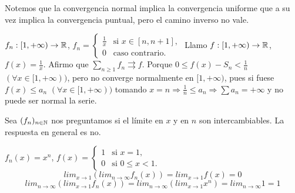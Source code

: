 Notemos que la convergencia normal implica la convergencia uniforme que a su vez implica la convergencia puntual, pero el camino inverso no vale.

\begin{eg}
  $f_n: [1, +\infty) \to \mathbb{R}$, $f_n = \begin{cases}
    \frac{1}{x} & \text{si } x \in [n, n+1], \\
    0 & \text{caso contrario.}
  \end{cases}$
  Llamo $f: [1, +\infty) \to \mathbb{R}$, $f(x) = \frac{1}{x}$. Afirmo que $\sum_{n \geq 1} f_n \rightrightarrows f$. Porque $0 \leq f(x) - S_n < \frac{1}{n}$ $(\forall x \in [1, +\infty))$, pero no converge normalmente en $[1, +\infty)$, pues si fuese $f(x) \leq a_n$ $(\forall x \in [1, +\infty))$ tomando $x = n \Rightarrow \frac{1}{n} \leq a_n \Rightarrow \sum a_n = +\infty$ y no puede ser normal la serie.
\end{eg}

\begin{note}
  Sea $(f_n)_{n \in \mathbb{N}}$ nos preguntamos si el límite en $x$ y en $n$ son intercambiables. La respuesta en general es no.
\end{note}

\begin{eg}
  $f_n(x) = x^n$, $f(x) = \begin{cases}
    1 & \text{si } x = 1, \\
    0 & \text{si } 0 \leq x < 1. 
  \end{cases}$ \begin{equation}
    lim_{x \to 1} (lim_{n \to \infty} f_n(x)) = lim_{x \to 1} f(x) = 0
  \end{equation}
  \begin{equation}
    lim_{n \to \infty} (lim_{x \to 1} f_n(x)) = lim_{n \to \infty} (lim_{x \to 1} x^n) = lim_{n \to \infty} 1 = 1
  \end{equation}
\end{eg}

